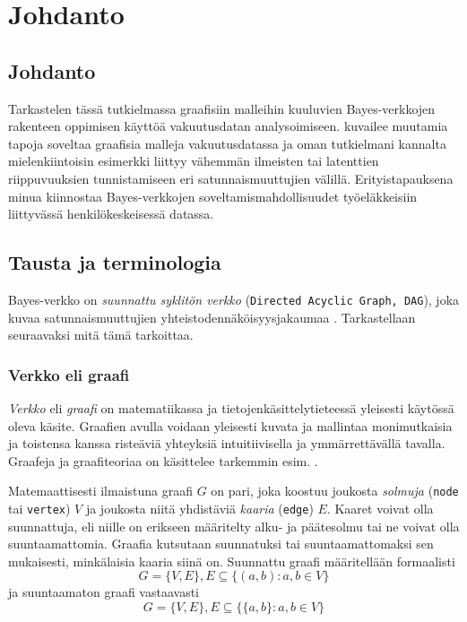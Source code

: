 \chapter{Johdanto\label{intro}}


\section{Johdanto}
Tarkastelen tässä tutkielmassa graafisiin malleihin kuuluvien Bayes-verkkojen rakenteen oppimisen käyttöä vakuutusdatan analysoimiseen. \citet{ramsahai_connecting_2020} kuvailee muutamia tapoja soveltaa graafisia malleja vakuutusdatassa ja oman tutkielmani kannalta mielenkiintoisin esimerkki liittyy vähemmän ilmeisten tai latenttien riippuvuuksien tunnistamiseen eri satunnaismuuttujien välillä. Erityistapauksena minua kiinnostaa Bayes-verkkojen soveltamismahdollisuudet työeläkkeisiin liittyvässä henkilökeskeisessä datassa.

\section{Tausta ja terminologia}
Bayes-verkko on \emph{suunnattu syklitön verkko} (\texttt{Directed Acyclic Graph, DAG}), joka kuvaa satunnaismuuttujien yhteistodennäköisyysjakaumaa \citep{ruggeri_bayesian_2008}. Tarkastellaan seuraavaksi mitä tämä tarkoittaa.

\subsection{Verkko eli graafi}
\emph{Verkko} eli \emph{graafi} on matematiikassa ja tietojenkäsittelytieteessä yleisesti käytössä oleva käsite. Graafien avulla voidaan yleisesti kuvata ja mallintaa monimutkaisia ja toistensa kanssa risteäviä yhteyksiä intuitiivisella ja ymmärrettävällä tavalla. Graafeja ja graafiteoriaa on käsittelee tarkemmin esim. \citet{diestel_graph_2017}.

Matemaattisesti ilmaistuna graafi $G$ on pari, joka koostuu joukosta \emph{solmuja} (\texttt{node} tai \texttt{vertex}) $V$ ja joukosta niitä yhdistäviä \emph{kaaria} (\texttt{edge}) $E$. Kaaret voivat olla suunnattuja, eli niille on erikseen määritelty alku- ja päätesolmu tai ne voivat olla suuntaamattomia. Graafia kutsutaan suunnatuksi tai suuntaamattomaksi sen mukaisesti, minkälaisia kaaria siinä on. Suunnattu graafi määritellään formaalisti 
$$
    G = \{V, E\}, E \subseteq \{(a,b) : a,b \in V \}
$$
ja suuntaamaton graafi vastaavasti
$$
    G = \{V, E\}, E \subseteq \{\{a,b\} : a,b \in V \}
$$

